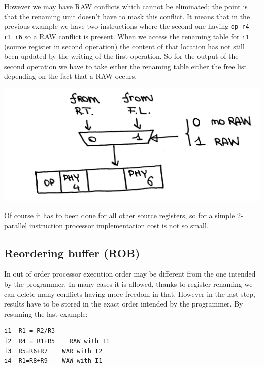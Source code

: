 However we may have RAW conflicts which cannot be eliminated; the point is that the renaming unit doesn't have to mask this conflict. It means that in the previous example we have two instructions where the second one having \verb|op r4 r1 r6| so a RAW conflict is present. When we access the renaming table for \verb|r1| (source register in second operation) the content of that location has not still been updated by the writing of the first operation. So for the output of the second operation we have to take either the renaming table either the free list depending on the fact that a RAW occurs.

\begin{center}
  \includegraphics[width=0.7\linewidth]{img/img3/27}
\end{center}

Of course it has to been done for all other source registers, so for a simple 2-parallel instruction processor implementation cost is not so small.

\subsection{Reordering buffer (ROB)}
In out of order processor execution order may be different from the one intended by the programmer. In many cases it is allowed, thanks to register renaming we can delete many conflicts having more freedom in that. However in the last step, results have to be stored in the exact order intended by the programmer. By resuming the last example:

\begin{verbatim}
i1  R1 = R2/R3
i2  R4 = R1+R5    RAW with I1
i3  R5=R6+R7    WAR with I2
i4  R1=R8+R9    WAW with I1
\end{verbatim}

